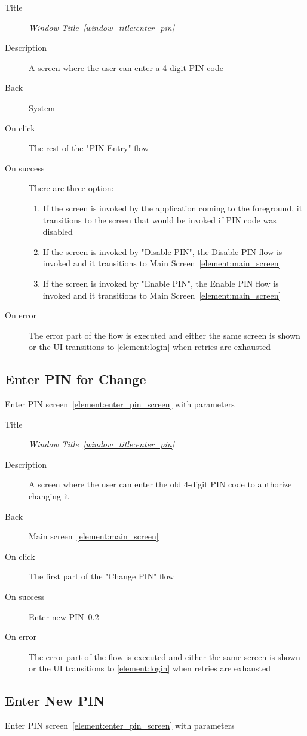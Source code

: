\documentclass[a4paper,10pt]{article}
\newcommand{\windowTitleLabelText}{Window Title}
\newcommand{\windowTitleLabel}{window_title:}
\DeclareRobustCommand{\windowTitleRef}[1]{%
   \emph{\windowTitleLabelText~\ref{\windowTitleLabel#1}}}
\newcommand{\elementLabel}{element:}
\DeclareRobustCommand{\element}[2]{\subsection{#1}\label{\elementLabel#2}}
\DeclareRobustCommand{\elementRef}[1]{\ref{\elementLabel#1}}
\begin{document}
\begin{description}
 \item[Title] \windowTitleRef{enter_pin}
 \item[Description] A screen where the user can enter a 4-digit PIN code
 \item[Back] System
 \item[On click] The rest of the "PIN Entry" flow
 \item[On success] There are three option:
 \begin{enumerate}
  \item If the screen is invoked by the application coming to the foreground, 
it transitions to the screen that would be invoked if PIN code was disabled
  \item If the screen is invoked by "Disable PIN", the Disable PIN flow is 
invoked and it transitions to Main Screen~\elementRef{main_screen}
  \item If the screen is invoked by "Enable PIN", the Enable PIN flow is 
invoked and it transitions to Main Screen~\elementRef{main_screen}
 \end{enumerate}
 \item[On error] The error part of the flow is executed and either the same 
screen is shown or the UI transitions to \elementRef{login} when retries are 
exhausted
\end{description}

\element{Enter PIN for Change}{enter_pin_change}
Enter PIN screen~\elementRef{enter_pin_screen} with parameters

\begin{description}
 \item[Title] \windowTitleRef{enter_pin}
 \item[Description] A screen where the user can enter the old 4-digit PIN code 
to authorize changing it
 \item[Back] Main screen~\elementRef{main_screen}
 \item[On click] The first part of the "Change PIN" flow
 \item[On success] Enter new PIN~\elementRef{enter_new_pin}
 \item[On error] The error part of the flow is executed and either the same 
screen is shown or the UI transitions to \elementRef{login} when retries are 
exhausted
\end{description}

\element{Enter New PIN}{enter_new_pin}
Enter PIN screen~\elementRef{enter_pin_screen} with parameters
\end{document}
